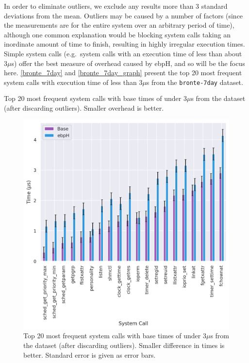 \documentclass[
  12pt]{findlay}
\newcommand{\passthrough}[1]{#1}
\begin{document}
In order to eliminate outliers, we exclude any results more than 3
standard deviations from the mean. Outliers may be caused by a number of
factors (since the measurements are for the entire system over an
arbitrary period of time), although one common explanation would be
blocking system calls taking an inordinate amount of time to finish,
resulting in highly irregular execution times. Simple system calls
(e.g.~system calls with an execution time of less than about \(3\mu\)s)
offer the best measure of overhead caused by ebpH, and so will be the
focus here. \autoref{bronte_7day} and \autoref{bronte_7day_graph}
present the top 20 most frequent system calls with execution time of
less than \(3\mu\)s from the \passthrough{\lstinline!bronte-7day!}
dataset.

\begin{table}
    \caption[Top 20 most frequent system calls with base times of under 3$\mu$s from the  dataset]{
        Top 20 most frequent system calls with base times of under 3$\mu$s from the 
        dataset (after discarding outliers). Smaller overhead is better.
    }
    \label{bronte_7day}
    
\end{table}

\begin{figure}
    \caption[Top 20 most frequent system calls with base times of under 3$\mu$s from the  dataset]{
        Top 20 most frequent system calls with base times of under 3$\mu$s from the
         dataset (after discarding outliers).
        Smaller difference in times is better. Standard error is given as error bars.
    }
    \label{bronte_7day_graph}
    \includegraphics[width=.6\textwidth]{../data/bench/bronte-7day/under_3us_times.png}
\end{figure}
\end{document}

